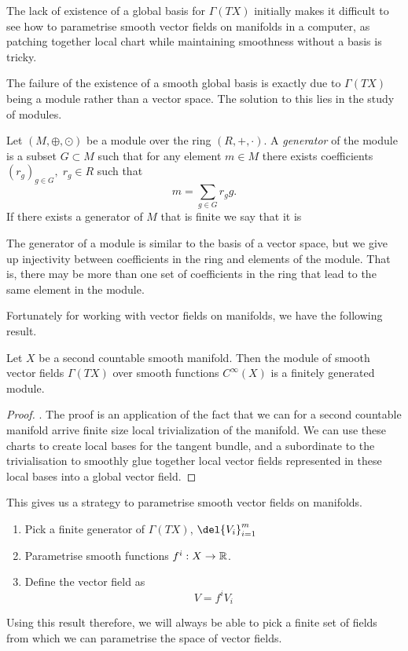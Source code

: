 The lack of existence of a global basis for \(\Gamma(TX)\) initially makes it difficult to see how to parametrise smooth vector fields on manifolds in a computer, as patching together local chart while maintaining smoothness without a basis is tricky.

The failure of the existence of a smooth global basis is exactly due to \(\Gamma(TX)\) being a module rather than a vector space.
The solution to this lies in the study of modules.

\begin{definition}
	Let \((M, \oplus, \odot)\) be a module over the ring \((R, +, \cdot)\).
	A \emph{generator} of the module is a subset \(G \subset M\) such that for any element \(m \in M\) there exists coefficients \((r_g)_{g \in G}, \; r_g \in R\) such that 
	\[
		m = \sum_{g\in G} r_g g	
	.\]
	If there exists a generator of \(M\) that is finite we say that it is 
\end{definition}
The generator of a module is similar to the basis of a vector space, but we give up injectivity between coefficients in the ring and elements of the module.
That is, there may be more than one set of coefficients in the ring that lead to the same element in the module.

Fortunately for working with vector fields on manifolds, we have the following result.
\begin{theorem}
	Let \(X\) be a second countable smooth manifold.
	Then the module of smooth vector fields \(\Gamma(TX)\) over smooth functions \(C^\infty(X)\) is a finitely generated module.
\end{theorem}
\begin{proof}
	\textcite[see]{falorsi2020neural}.
	The proof is an application of the fact that we can for a second countable manifold arrive finite size local trivialization of the manifold.
	We can use these charts to create local bases for the tangent bundle, and a  subordinate to the trivialisation to smoothly glue together local vector fields represented in these local bases into a global vector field.
\end{proof}
This gives us a strategy to parametrise smooth vector fields on manifolds.
\begin{enumerate}
	\item Pick a finite generator of \(\Gamma(TX)\), \(\del{V_i}_{i=1}^m\)
	\item Parametrise smooth functions \(f^i: X\to \mathbb{R}\).
	\item Define the vector field as \[V = f^i V_i\]
\end{enumerate}
Using this result therefore, we will always be able to pick a finite set of fields from which we can parametrise the space of vector fields.


